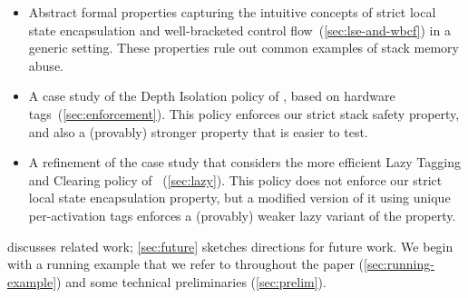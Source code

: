 \documentclass[acmsmall,review,anonymous]{acmart}\settopmatter{printfolios=true,printccs=false,printacmref=false}
\begin{document}
\begin{itemize}
\item
  Abstract formal properties capturing the
  intuitive concepts of strict local state encapsulation and well-bracketed
  control flow~(\cref{sec:lse-and-wbcf}) in a generic setting. These properties
  rule out common examples of stack memory abuse.
\item
  A case study of the Depth Isolation policy of \citet{DBLP:conf/sp/RoesslerD18}, based on hardware tags~(\cref{sec:enforcement}).
  This policy enforces our strict stack safety property, and also a (provably) stronger property that is easier to test.
   
\item
  A refinement of the case study that considers the more efficient Lazy Tagging and Clearing policy
  of \citet{DBLP:conf/sp/RoesslerD18}~(\cref{sec:lazy}).  This policy does not enforce our strict
  local state encapsulation property,
  but a modified version of it using unique per-activation tags enforces
  a (provably) weaker lazy variant of the property.
%

\end{itemize}
 discusses related work;
\cref{sec:future} sketches directions for future work.
%
We begin with a running example that we refer
to throughout the paper (\cref{sec:running-example}) and some
technical preliminaries (\cref{sec:prelim}).
\end{document}
